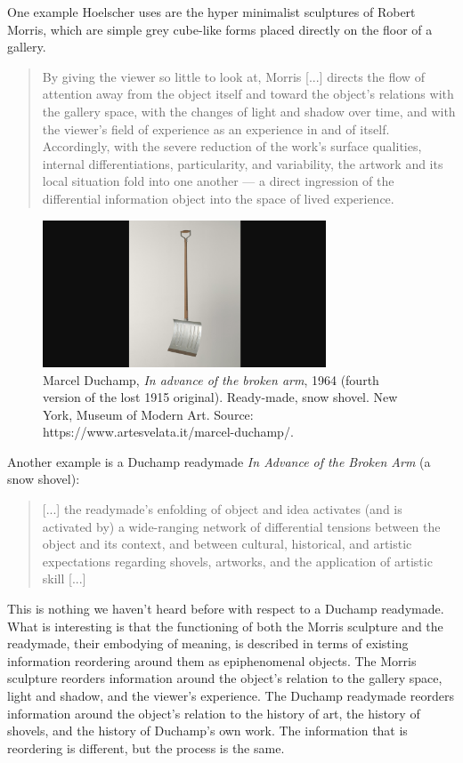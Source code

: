 \documentclass[letterpaper]{article}
\begin{document}
    One example Hoelscher uses are the hyper minimalist sculptures of Robert Morris, which are simple grey cube-like forms placed directly on the floor of a gallery.

    \begin{quote}
        By giving the viewer so little to look at, Morris [...] directs the flow of attention away from the object itself and toward the object's relations with the gallery space, with the changes of light and shadow over time, and with the viewer's field of experience as an experience in and of itself. Accordingly, with the severe reduction of the work's surface qualities, internal differentiations, particularity, and variability, the artwork and its local situation fold into one another — a direct ingression of the differential information object into the space of lived experience. \citep[p.78]{HoelscherArtAsInfrmtn2021}
    \end{quote}

    \begin{figure}[h]
    \includegraphics[width=3.31in]{snow-shovel.png}
    \caption{Marcel Duchamp, \emph{In advance of the broken arm}, 1964 (fourth version of the lost 1915 original). Ready-made, snow shovel. New York, Museum of Modern Art. Source: https://www.artesvelata.it/marcel-duchamp/.}
    \end{figure}

    Another example is a Duchamp readymade \emph{In Advance of the Broken Arm} (a snow shovel):

    \begin{quote}
        [...] the readymade's enfolding of object and idea activates (and is activated by) a wide-ranging network of differential tensions between the object and its context, and between cultural, historical, and artistic expectations regarding shovels, artworks, and the application of artistic skill [...]
    \end{quote}

    This is nothing we haven't heard before with respect to a Duchamp readymade. What is interesting is that the functioning of both the Morris sculpture and the readymade, their embodying of meaning, is described in terms of existing information reordering around them as epiphenomenal objects. The Morris sculpture reorders information around the object's relation to the gallery space, light and shadow, and the viewer's experience. The Duchamp readymade reorders information around the object's relation to the history of art, the history of shovels, and the history of Duchamp's own work. The information that is reordering is different, but the process is the same.
\end{document}
